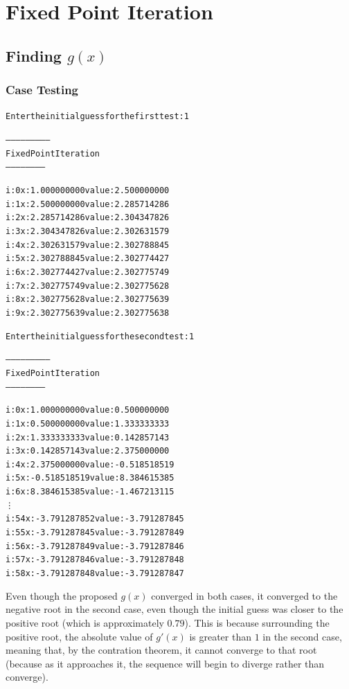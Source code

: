 \documentclass[11pt]{article} %
\begin{document}
\section*{Fixed Point Iteration}

\subsection*{Finding $g(x)$}

\subsubsection*{Case Testing}
\begin{alltt}
Enter the initial guess for the first test: 1 

--------------------------
 Fixed Point Iteration
 -----------------------


i: 0	x: 1.000000000	value: 2.500000000
i: 1	x: 2.500000000	value: 2.285714286
i: 2	x: 2.285714286	value: 2.304347826
i: 3	x: 2.304347826	value: 2.302631579
i: 4	x: 2.302631579	value: 2.302788845
i: 5	x: 2.302788845	value: 2.302774427
i: 6	x: 2.302774427	value: 2.302775749
i: 7	x: 2.302775749	value: 2.302775628
i: 8	x: 2.302775628	value: 2.302775639
i: 9	x: 2.302775639	value: 2.302775638

Enter the initial guess for the second test:  1

--------------------------
 Fixed Point Iteration
 -----------------------


i: 0	x: 1.000000000	value: 0.500000000
i: 1	x: 0.500000000	value: 1.333333333
i: 2	x: 1.333333333	value: 0.142857143
i: 3	x: 0.142857143	value: 2.375000000
i: 4	x: 2.375000000	value: -0.518518519
i: 5	x: -0.518518519	value: 8.384615385
i: 6	x: 8.384615385	value: -1.467213115
\vdots
i: 54	x: -3.791287852	value: -3.791287845
i: 55	x: -3.791287845	value: -3.791287849
i: 56	x: -3.791287849	value: -3.791287846
i: 57	x: -3.791287846	value: -3.791287848
i: 58	x: -3.791287848	value: -3.791287847
\end{alltt}
\par Even though the proposed $g(x)$ converged in both cases, it converged to the negative root in the second case, even though the initial guess
was closer to the positive root (which is approximately $0.79$). This is because surrounding the positive root, the absolute value of $g'(x)$ is greater than $1$ in the second case, meaning that, by the contration theorem, it cannot converge to that root (because as it approaches it, the sequence will begin to diverge rather than converge).
\end{document}
